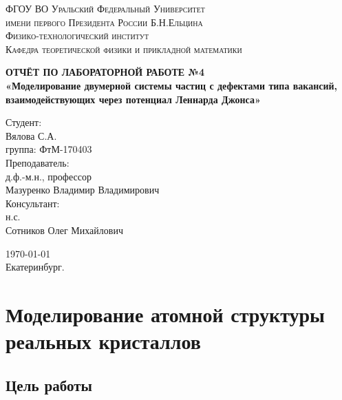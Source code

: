 \documentclass[14pt,a4paper,report]{ncc}
\begin{document}
\def\contentsname{Содержание}

\begin{titlepage}
\begin{center}
\textsc{ФГОУ ВО Уральский Федеральный Университет \\ имени первого Президента России Б.Н.Ельцина\\[5mm]
Физико-технологический институт\\[2mm]
Кафедра теоретической физики и прикладной математики}

\vfill

\textbf{ОТЧЁТ ПО ЛАБОРАТОРНОЙ РАБОТЕ №4\\[3mm]
«Моделирование двумерной системы частиц с дефектами типа вакансий, взаимодействующих через потенциал Леннарда Джонса»\\[6mm]
}
\end{center}

\hfill
\begin{minipage}{.5\textwidth}
Студент:\\[2mm] 
Вялова С.А.\\
группа: ФтМ-170403 \\[5mm]

Преподаватель:\\[2mm] 
д.ф.-м.н., профессор\\
Мазуренко Владимир Владимирович\\[5mm]

Консультант:\\[2mm] 
н.с.\\
Сотников Олег Михайлович\\

\end{minipage}%
\vfill
\begin{center}
\today  \\
 Екатеринбург.
\end{center}
\end{titlepage}

\tableofcontents
\newpage
\chapter{Моделирование атомной структуры реальных кристаллов}
\section{Цель работы}
\end{document}
